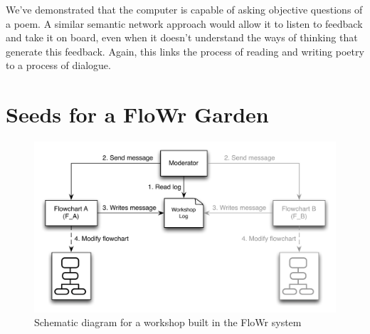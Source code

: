 We've demonstrated that the computer is capable of asking objective questions of a poem.  A similar semantic network approach would allow it to listen to feedback and take it on board, even when it doesn't understand the ways of thinking that generate this feedback.  Again, this links the process of reading and writing poetry to a process of dialogue.

\section{Seeds for a FloWr Garden}

\begin{figure}[t]
\begin{center}
\includegraphics[width=\columnwidth]{figures/Schema}
\end{center}
\caption{Schematic diagram for a workshop built in the FloWr system\label{fig:workshop_schematic}}
\end{figure}

